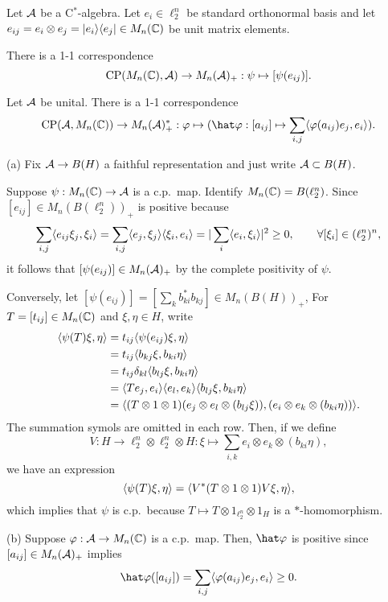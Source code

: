 \documentclass{../../../small}
\begin{document}
\begin{thm}
Let $\mathcal{A}$ be a C$^*$-algebra.
Let $e_i\in\ell_2^n$ be standard orthonormal basis and let $e_{ij}=e_i\otimes e_j=|e_i\rangle\langle e_j|\in M_n(\mathbb{C})$ be unit matrix elements.
\begin{parts}
\item
There is a 1-1 correspondence
\[\mathrm{CP}(M_n(\mathbb{C}),\mathcal{A})\to M_n(\mathcal{A})_+:\psi\mapsto[\psi(e_{ij})].\]
\item
Let $\mathcal{A}$ be unital.
There is a 1-1 correspondence
\[\mathrm{CP}(\cA,M_n(\C))\to M_n(\cA)^*_+:\f\mapsto(\hat\f:[a_{ij}]\mapsto\sum_{i,j}\<\f(a_{ij})e_j,e_i\>).\]
\end{parts}
\end{thm}
\begin{pf}
(a)
Fix $\mathcal{A}\to B(H)$ a faithful representation and just write $\mathcal{A}\subset B(H)$.

Suppose $\psi:M_n(\mathbb{C})\to\mathcal{A}$ is a c.p.~map.
Identify $M_n(\mathbb{C})=B(\ell_2^n)$.
Since $[e_{ij}]\in M_n(B(\ell_2^n))_+$ is positive because
\[\sum_{i,j}\langle e_{ij}\xi_j,\xi_i\rangle=\sum_{i,j}\langle e_j,\xi_j\rangle\langle\xi_i,e_i\rangle=|\sum_i\langle e_i,\xi_i\rangle|^2\ge0,\qquad\forall[\xi_i]\in(\ell_2^n)^n,\]
it follows that $[\psi(e_{ij})]\in M_n(\mathcal{A})_+$ by the complete positivity of $\psi$.

Conversely, let $[\psi(e_{ij})]=[\sum_kb_{ki}^*b_{kj}]\in M_n(B(H))_+$,
For $T=[t_{ij}]\in M_n(\mathbb{C})$ and $\xi,\eta\in H$, write
\begin{align*}
\langle\psi(T)\xi,\eta\rangle
&=t_{ij}\langle\psi(e_{ij})\xi,\eta\rangle\\
&=t_{ij}\langle b_{kj}\xi,b_{ki}\eta\rangle\\
&=t_{ij}\delta_{kl}\langle b_{lj}\xi,b_{ki}\eta\rangle\\
&=\langle Te_j,e_i\rangle\langle e_l,e_k\rangle\langle b_{lj}\xi,b_{ki}\eta\rangle\\
&=\langle(T\otimes1\otimes1)(e_j\otimes e_l\otimes(b_{lj}\xi)),(e_i\otimes e_k\otimes(b_{ki}\eta))\rangle.
\end{align*}
The summation symols are omitted in each row.
Then, if we define
\[V:H\to\ell_2^n\otimes\ell_2^n\otimes H:\xi\mapsto\sum_{i,k}e_i\otimes e_k\otimes(b_{ki}\eta),\]
we have an expression
\[\langle\psi(T)\xi,\eta\rangle=\langle V^*(T\otimes1\otimes1)V\xi,\eta\rangle,\]
which implies that $\psi$ is c.p.~because $T\mapsto T\otimes1_{\ell_2^n}\otimes1_H$ is a $*$-homomorphism.

(b)
Suppose $\varphi:\mathcal{A}\to M_n(\mathbb{C})$ is a c.p.~map.
Then, $\hat\f$ is positive since $[a_{ij}]\in M_n(\mathcal{A})_+$ implies
\[\hat\f([a_{ij}])=\sum_{i,j}\<\f(a_{ij})e_j,e_i\>\ge0.\]


\end{pf}
\end{document}
